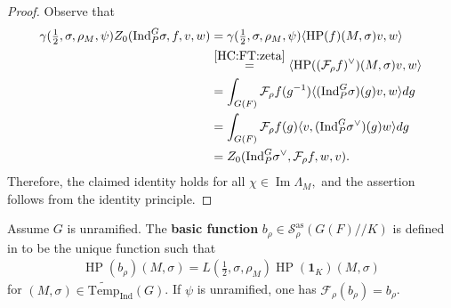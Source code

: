 \documentclass[10pt]{amsart}
\newtheorem{corollary}{Corollary}[theorem]
\theoremstyle{definition}
\numberwithin{equation}{section}
\numberwithin{equation}{subsection}
\newcommand{\Ind}{\mathrm{Ind}}
\newcommand{\Temp}{\mathrm{Temp}}
\renewcommand{\Im}{\mathop{\mathrm{Im}}}
\newcommand{\HP}{\mathop{\mathrm{HP}}\nolimits}
\begin{document}
\begin{proof} 
Observe that
\begin{align*}
    \gamma(\tfrac{1}{2},\sigma,\rho_M,\psi) Z_0(\Ind_P^G\sigma,f,v,w)&=
    \gamma(\tfrac{1}{2},\sigma,\rho_M,\psi)\langle\HP(f)(M,\sigma)v,w\rangle \\
    &\stackrel{\eqref{HC:FT:zeta}}{=}\langle\HP((\mathcal{F}_\rho f)^\vee)(M,\sigma)v,w\rangle \\
    &= \int_{G(F)} \mathcal{F}_\rho f(g^{-1})\langle(\Ind_P^G \sigma)(g)v,w\rangle dg\\
    &=\int_{G(F)} \mathcal{F}_\rho f(g)\langle v,(\Ind_P^G \sigma^\lor) (g)w\rangle dg\\
    &=Z_0(\Ind_P^G \sigma^\lor, \mathcal{F}_\rho f,w,v). 
\end{align*}
Therefore, the claimed identity holds for all $\chi\in \Im \Lambda_M,$ and the assertion follows from the identity principle.
\end{proof}





Assume $G$ is unramified. The \textbf{basic function} $b_\rho\in \mathcal{S}^{\mathrm{as}}_\rho(G(F)/\!/K)$ is defined in \cite[\S4.2]{DRS} to be the unique function such that 
\begin{align*}
    \HP(b_\rho)(M,\sigma)=L(\tfrac{1}{2},\sigma,\rho_M)\HP(\mathbf{1}_K)(M,\sigma)
\end{align*}
for $(M,\sigma)\in\widetilde{\Temp}_\Ind(G)$. If $\psi$ is unramified, one has $\mathcal{F}_{\rho}(b_\rho) = b_\rho$.
\end{document}

